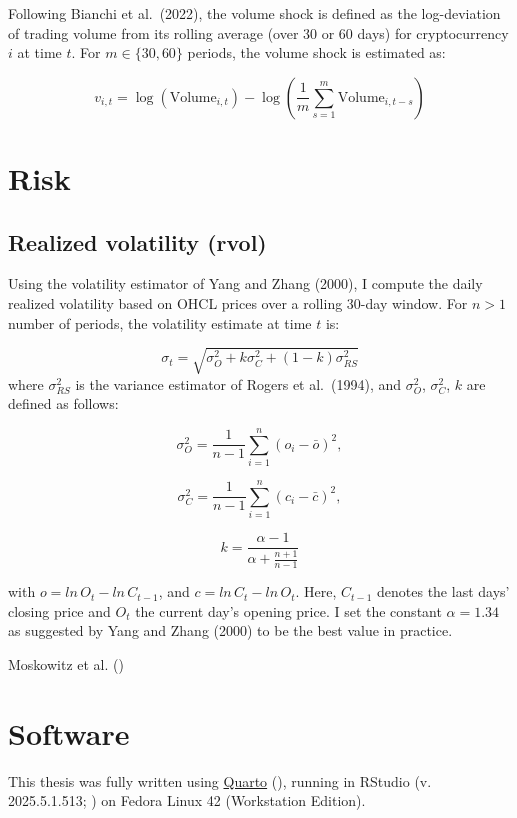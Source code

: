 \documentclass[
  12pt,
  a4paper,
  openany]{scrbook}
\begin{document}
Following Bianchi et al.~(2022), the volume shock is defined as the
log-deviation of trading volume from its rolling average (over 30 or 60
days) for cryptocurrency \(i\) at time \(t\). For \(m \in \{30, 60\}\)
periods, the volume shock is estimated as:

\[
v_{i,t} = \log(\text{Volume}_{i,t}) - \log\left( \frac{1}{m} \sum_{s=1}^{m} \text{Volume}_{i,t-s} \right)
\]

\section{Risk}\label{risk}

\subsection{Realized volatility (rvol)}\label{realized-volatility-rvol}

Using the volatility estimator of Yang and Zhang (2000), I compute the
daily realized volatility based on OHCL prices over a rolling 30-day
window. For \(n > 1\) number of periods, the volatility estimate at time
\(t\) is:

\[
\sigma_t = \sqrt{\sigma^2_O + k\sigma^2_C + (1 - k)\sigma^2_{RS}}
\] where \(\sigma^2_{RS}\) is the variance estimator of Rogers et
al.~(1994), and \(\sigma^2_O\), \(\sigma^2_C\), \(k\) are defined as
follows:

\[
\sigma^2_O = \frac{1}{n-1}\sum\limits_{i=1}^n(o_i - \bar o)^2,
\]

\[
\sigma^2_C = \frac{1}{n-1}\sum\limits_{i=1}^n(c_i - \bar c)^2,
\]

\[
k = \frac{\alpha -1}{\alpha + \frac{n+1}{n-1}}
\]

with \(o = ln\,O_t - ln\,C_{t-1}\), and \(c = ln\,C_t - ln\,O_t\). Here,
\(C_{t-1}\) denotes the last days' closing price and \(O_t\) the current
day's opening price. I set the constant \(\alpha = 1.34\) as suggested
by Yang and Zhang (2000) to be the best value in practice.

Moskowitz et al. ()

\section{Software}\label{sec-software}

This thesis was fully written using \href{https://quarto.org/}{Quarto}
(), running in RStudio
(v. 2025.5.1.513; ) on Fedora
Linux 42 (Workstation Edition).
\end{document}
